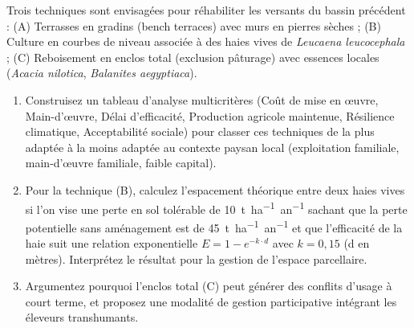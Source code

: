 \documentclass[11pt]{article}
\begin{document}
\begin{exercice}
Trois techniques sont envisagées pour réhabiliter les versants du bassin précédent : (A) Terrasses en gradins (bench terraces) avec murs en pierres sèches ; (B) Culture en courbes de niveau associée à des haies vives de \textit{Leucaena leucocephala} ; (C) Reboisement en enclos total (exclusion pâturage) avec essences locales (\textit{Acacia nilotica}, \textit{Balanites aegyptiaca}).

\begin{enumerate}
    \item[2 pts] Construisez un tableau d'analyse multicritères (Coût de mise en œuvre, Main-d'œuvre, Délai d'efficacité, Production agricole maintenue, Résilience climatique, Acceptabilité sociale) pour classer ces techniques de la plus adaptée à la moins adaptée au contexte paysan local (exploitation familiale, main-d'œuvre familiale, faible capital).
    \item[2 pts] Pour la technique (B), calculez l'espacement théorique entre deux haies vives si l'on vise une perte en sol tolérable de \SI{10}{t.ha^{-1}.an^{-1}} sachant que la perte potentielle sans aménagement est de \SI{45}{t.ha^{-1}.an^{-1}} et que l'efficacité de la haie suit une relation exponentielle $E = 1 - e^{-k \cdot d}$ avec $k=0,15$ (d en mètres). Interprétez le résultat pour la gestion de l'espace parcellaire.
    \item[2 pts] Argumentez pourquoi l'enclos total (C) peut générer des conflits d'usage à court terme, et proposez une modalité de gestion participative intégrant les éleveurs transhumants.
\end{enumerate}
\end{exercice}
\end{document}
